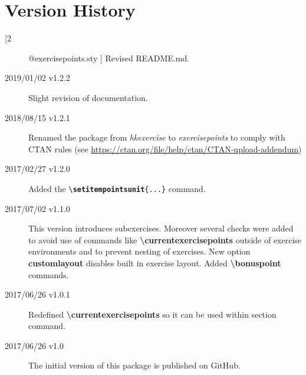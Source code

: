 \documentclass[
  twocolumn,%
  fontsize=9pt,%
  DIV=calc,%
  numbers=noendperiod%
]{scrartcl}
\makeatletter
\newcommand{\emphstyle}{\ttfamily\color{NavyBlue}\bfseries}%
\newcommand{\keyword}[1]{{\emphstyle#1}}%
\newcommand{\packageversion}{\StrBefore[2]{\expandafter\csname ver@exercisepoints.sty\endcsname}{ }}
\makeatother
\begin{document}
\section{Version History}
\begin{description}
\item[\packageversion] Revised README.md.
\item[2019/01/02 v1.2.2] Slight revision of documentation.
\item[2018/08/15 v1.2.1] Renamed the package from \emph{hkexercise} to \emph{exercisepoints} to comply with CTAN rules (see \url{https://ctan.org/file/help/ctan/CTAN-upload-addendum})
\item[2017/02/27 v1.2.0] Added the \texttt{\textbackslash\keyword{setitempointsunit}\{...\}} command.
\item[2017/07/02 v1.1.0] This version introduces subexercises. Moreover several checks were added to avoid use of commands like \textcolor{NavyBlue}{\ttfamily\bfseries\textbackslash currentexercisepoints} outside of exercise environments and to prevent nesting of exercises. New option \textcolor{NavyBlue}{\ttfamily\bfseries customlayout} disables built in exercise layout. Added \textcolor{NavyBlue}{\ttfamily\bfseries\textbackslash bonuspoint} commands.
\item[2017/06/26 v1.0.1] Redefined \textcolor{NavyBlue}{\ttfamily\bfseries\textbackslash currentexercisepoints} so it can be used within section command. 
\item[2017/06/26 v1.0] The initial version of this package is published on GitHub.
\end{description}
\end{document}
